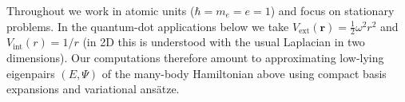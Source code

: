 Throughout we work in atomic units ($\hbar=m_e=e=1$) and focus on stationary problems.
In the quantum-dot applications below we take
$V_{\text{ext}}(\mathbf r)=\tfrac12 \omega^2 r^2$ and $V_{\text{int}}(r)=1/r$ (in 2D this is
understood with the usual Laplacian in two dimensions). Our computations therefore amount to
approximating low-lying eigenpairs $(E,\Psi)$ of the many-body Hamiltonian above using compact
basis expansions and variational ansätze.


